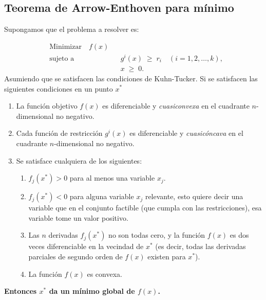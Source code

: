 \documentclass{article}
\begin{document}
\subsection*{Teorema de Arrow-Enthoven para mínimo}
Supongamos que el problema a resolver es:

\[
\begin{aligned}
&\text{Minimizar} \quad f(x) \\
&\text{sujeto a} \quad && g^{i}(x) \;\ge\; r_{i}
\quad (i = 1,2,\dots,k),\\
& && x \;\ge\; 0.
\end{aligned}
\]
Asumiendo que se satisfacen las condiciones de Kuhn-Tucker.
Si se satisfacen las siguientes condiciones en un punto $x^*$
\begin{enumerate}\color{teal}
  \item La función objetivo \(f(x)\) es diferenciable y \emph{cuasiconvexa} en el cuadrante \(n\)-dimensional no negativo.
  \item Cada función de restricción \(g^{i}(x)\) es diferenciable y \emph{cuasicóncava} en el cuadrante \(n\)-dimensional no negativo.
  \item Se satisface cualquiera de los siguientes:
    \begin{enumerate}
      \item \(f_{j}(x^{*}) > 0\) para al menos una variable \(x_{j}\).
      \item \(f_{j}(x^{*}) < 0\) para alguna variable \(x_{j}\) relevante, esto quiere decir una variable que en el conjunto factible (que cumpla con las restricciones), esa variable tome un valor positivo.
      \item Las \(n\) derivadas \(f_{j}(x^{*})\) no son todas cero, y la función \(f(x)\) es dos veces diferenciable en la vecindad de \(x^{*}\) (es decir, todas las derivadas parciales de segundo orden de \(f(x)\) existen para \(x^{*}\)).
      \item La función \(f(x)\) es convexa.
    \end{enumerate}
\end{enumerate}

\textbf{\color{teal}Entonces \(x^{*}\) da un mínimo global de \(f(x)\).
}
\end{document}
